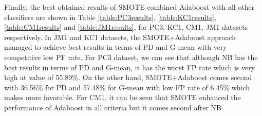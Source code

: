 \documentclass[runningheads,a4paper]{llncs}
\begin{document}
Finally, the best obtained results of SMOTE combined Adaboost with all other classifiers are shown in Table \ref{table:PC3results}, \ref{table:KC1results}, \ref{table:CM1results} and \ref{table:JM1results}, for PC3, KC1, CM1, JM1 datasets respectively. In JM1 and KC1 datasets, the SMOTE+Adaboost approach managed to achieve best results in terms of PD and G-mean with very competitive low PF rate. For PC3 dataset, we can see that although NB has the best results in terms of PD and G-mean, it has the worst FP rate which is very high at value of 55.89\%. On the other hand, SMOTE+Adaboost comes second with 36.56\%  for PD and 57.48\% for G-mean with low FP rate of 6.45\% which makes more favorable. For CM1, it can be seen that SMOTE enhanced the performance of Adaboost in all criteria but it comes second after NB. 



\begin{table}[h]
\caption{Evaluation results for PC3 dataset}
\begin{centering}
\par\end{centering}
\label{table:PC3results}
\end{table}


\begin{table}[h]
\caption{Evaluation results for KC1 dataset}
\begin{centering}
\par\end{centering}
\label{table:KC1results}
\end{table}
\end{document}
